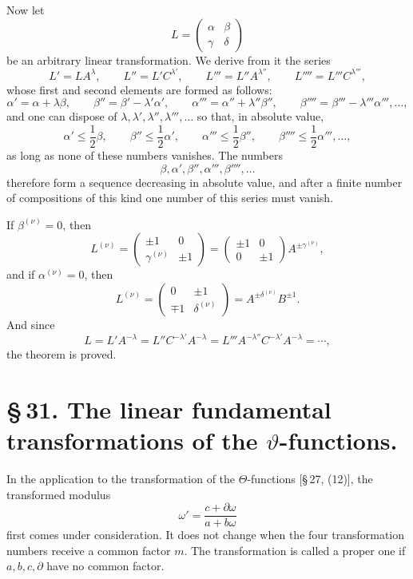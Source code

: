 \documentclass[11pt]{article}
\providecommand{\tht}{\vartheta}
\begin{document}
Now let
\[
L=\begin{pmatrix}\alpha&\beta\\\gamma&\delta\end{pmatrix}
\]
be an arbitrary linear transformation. We derive from it the series
\[
L'=LA^\lambda,
\qquad L''=L'C^{\lambda'},
\qquad L'''=L''A^{\lambda''},
\qquad L''''=L'''C^{\lambda'''},
\]
whose first and second elements are formed as follows:
\[
\alpha'=\alpha+\lambda\beta,
\qquad
\beta''=\beta'-\lambda'\alpha',
\qquad
\alpha'''=\alpha''+\lambda''\beta'',
\qquad
\beta''''=\beta'''-\lambda'''\alpha''',\ldots,
\]
and one can dispose of $\lambda,\lambda',\lambda'',\lambda''',\ldots$ so that, in absolute value,
\[
\alpha'\leq \frac12\beta,
\qquad
\beta''\leq \frac12\alpha',
\qquad
\alpha'''\leq \frac12\beta'',
\qquad
\beta''''\leq \frac12\alpha''',\ldots,
\]
as long as none of these numbers vanishes. The numbers
\[
\beta,\alpha',\beta'',\alpha''',\beta'''',\ldots
\]
therefore form a sequence decreasing in absolute value, and after a finite number of compositions of this kind one number of this series must vanish.

If $\beta^{(\nu)}=0$, then
\[
L^{(\nu)}=\begin{pmatrix}\pm1&0\\\gamma^{(\nu)}&\pm1\end{pmatrix}
=\begin{pmatrix}\pm1&0\\0&\pm1\end{pmatrix}A^{\pm\gamma^{(\nu)}},
\]
and if $\alpha^{(\nu)}=0$, then
\[
L^{(\nu)}=\begin{pmatrix}0&\pm1\\\mp1&\delta^{(\nu)}\end{pmatrix}=A^{\pm\delta^{(\nu)}}B^{\pm1}.
\]
And since
\[
L=L'A^{-\lambda}=L''C^{-\lambda'}A^{-\lambda}=L'''A^{-\lambda''}C^{-\lambda'}A^{-\lambda}=\cdots,
\]
the theorem is proved.

\section*{\S\,31. The linear fundamental transformations of the $\tht$-functions.}

In the application to the transformation of the $\Theta$-functions [\S\,27, (12)], the transformed modulus
\[
\omega'=\frac{c+\partial\omega}{a+b\omega}
\]
first comes under consideration. It does not change when the four transformation numbers receive a common factor $m$. The transformation is called a proper one if $a,b,c,\partial$ have no common factor.
\end{document}
